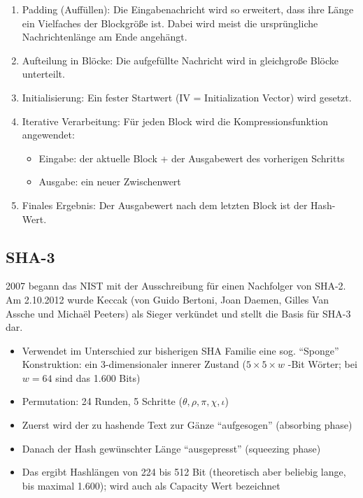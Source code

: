 \begin{enumerate}
    \item Padding (Auffüllen): Die Eingabenachricht wird so erweitert, dass ihre Länge ein Vielfaches der Blockgröße ist. Dabei wird meist die ursprüngliche 
    Nachrichtenlänge am Ende angehängt.
    \item Aufteilung in Blöcke: Die aufgefüllte Nachricht wird in gleichgroße Blöcke unterteilt.
    \item Initialisierung: Ein fester Startwert (IV = Initialization Vector) wird gesetzt.
    \item Iterative Verarbeitung: Für jeden Block wird die Kompressionsfunktion angewendet:
    \begin{itemize}
        \item Eingabe: der aktuelle Block + der Ausgabewert des vorherigen Schritts
        \item Ausgabe: ein neuer Zwischenwert
    \end{itemize}
    \item Finales Ergebnis: Der Ausgabewert nach dem letzten Block ist der Hash-Wert.
\end{enumerate}

\subsection{SHA-3}


2007 begann das NIST mit der Ausschreibung für einen Nachfolger von SHA-2. Am 2.10.2012 wurde Keccak (von Guido
Bertoni, Joan Daemen, Gilles Van Assche und Michaël Peeters) als Sieger verkündet und stellt die Basis für SHA-3 dar.

\begin{itemize}
    \item Verwendet im Unterschied zur bisherigen SHA Familie eine sog. ``Sponge'' Konstruktion: ein 3-dimensionaler innerer Zustand ($5\times 5\times w$ -Bit Wörter; 
    bei $w =64$ sind das 1.600 Bits)
    \item Permutation: 24 Runden, 5 Schritte ($\theta, \rho, \pi, \chi, \iota$)
    \item Zuerst wird der zu hashende Text zur Gänze ``aufgesogen'' (absorbing phase)
    \item Danach der Hash gewünschter Länge ``ausgepresst'' (squeezing phase)
    \item Das ergibt Hashlängen von 224 bis 512 Bit (theoretisch aber beliebig lange, bis maximal 1.600); wird auch als Capacity Wert bezeichnet
\end{itemize}

